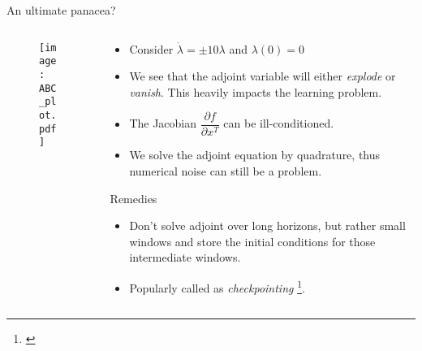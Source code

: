 \documentclass[dvipsnames, 9pt]{beamer}
\begin{document}
\begin{frame}{An ultimate panacea?}
    \begin{columns}
    {\begin{column}{0.45\textwidth}
    \begin{figure}
        \centering
        \texttt{[image: ABC\_plot.pdf]}
    \end{figure}
    \end{column}}
    {\begin{column}{0.5\textwidth}
    \begin{block}{}
        \begin{itemize}
            \item Consider $\dot{\lambda} = \pm 10 \lambda$ and $\lambda(0) = 0$
            \item We see that the adjoint variable will either \textit{explode} or 
            \textit{vanish}.
            This heavily impacts the learning problem. 
            \item The Jacobian $\dfrac{\partial f}{\partial x^T}$ can be ill-conditioned.
            \item We solve the adjoint equation by quadrature, thus numerical noise 
            can still be a problem.
        \end{itemize}
    \end{block}
    \begin{block}{Remedies}
        \begin{itemize}
            \item Don't solve adjoint over long horizons, but rather 
            small windows and store the initial conditions for those intermediate
            windows.
            \item Popularly called as \textit{checkpointing} \footnote[frame]{\cite{zhuang:dvornek:li:tatikonda:papademetris:duncan:2020}}.
        \end{itemize}
    \end{block}
    \end{column}}
    \end{columns}
\end{frame}
\end{document}
